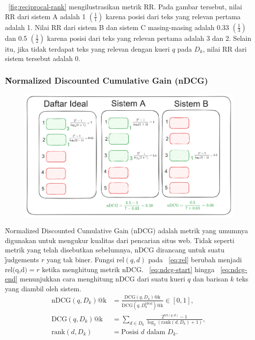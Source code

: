         \pic~\ref{fig:reciprocal-rank} mengilustrasikan metrik RR. Pada gambar tersebut, nilai RR dari sistem A adalah 1 $(\frac{1}{1})$ karena posisi dari teks yang relevan pertama adalah 1. Nilai RR dari sistem B dan sistem C masing-masing adalah  0.33 $(\frac{1}{3})$ dan 0.5 $(\frac{1}{2})$ karena posisi dari teks yang relevan pertama adalah 3 dan 2. Selain itu, jika tidak terdapat teks yang relevan dengan kueri $q$ pada $D_k$, nilai RR dari sistem tersebut adalah 0. 

    \subsubsection{\f{Normalized Discounted Cumulative Gain} (nDCG)}

        \begin{figure}
            \centering
            \includegraphics[width=1\textwidth]{assets/pics/contohnDCG.png}
            \label{fig:ndcg}
        \end{figure}
        \f{Normalized Discounted Cumulative Gain} (nDCG) adalah metrik yang umumnya digunakan untuk mengukur kualitas dari pencarian situs web. Tidak seperti metrik yang telah disebutkan sebelumnya, nDCG dirancang untuk suatu \f{judgements} $r$ yang tak biner. Fungsi $\text{rel}(q, d)$ pada \equ~\ref{eq:rel} berubah menjadi $\text{rel(q,d)}  = r $ ketika menghitung metrik nDCG. \equ~\ref{eq:ndcg-start} hingga \equ~\ref{eq:ndcg-end} menunjukkan cara menghitung nDCG dari suatu kueri $q$ dan barisan $k$ teks yang diambil oleh sistem.
        \begin{align}
            \label{eq:ndcg-start}
            \text{nDCG}(q, D_k)\text{@k} &= \frac{\text{DCG}(q, D_k)\text{@k}}{\text{DCG}(q, D_k^{\text{ideal}})\text{@k}} \in [0, 1], \\
            \label{eq:dcg}
            \text{DCG}(q, D_k)\text{@k} &= \sum_{d \in D_k} \frac{2^{\text{rel}(q, d)} - 1}{\log_2(\text{rank}(d, D_k) + 1)}, \\
            \label{eq:ndcg-end}
            \text{rank}(d,D_k) &= \text{Posisi } d \text{ dalam } D_k.
        \end{align}

